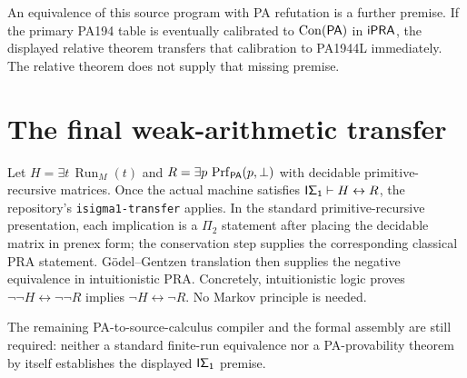 An equivalence of this source program with PA refutation is a further
premise. If the primary PA194 table is eventually calibrated to
$\operatorname{Con}(\mathsf{PA})$ in $\mathsf{iPRA}$, the displayed relative theorem
transfers that calibration to PA1944L immediately. The relative theorem
does not supply that missing premise.

\section{The final weak-arithmetic transfer}

Let $H=\exists t\,\operatorname{Run}_M(t)$ and
$R=\exists p\,\operatorname{Prf}_{\mathsf{PA}}(p,\bot)$ with decidable
primitive-recursive matrices. Once the actual machine satisfies
$\mathsf{I\Sigma_1}\vdash H\leftrightarrow R$, the repository's
\texttt{isigma1-transfer} applies. In the standard primitive-recursive
presentation, each implication is a $\Pi_2$ statement after placing the
decidable matrix in prenex form; the conservation step supplies the
corresponding classical PRA statement. G\"odel--Gentzen translation then
supplies the negative equivalence in intuitionistic PRA. Concretely,
intuitionistic logic proves $\neg\neg H\leftrightarrow\neg\neg R$
implies $\neg H\leftrightarrow\neg R$. No Markov principle is needed.

The remaining PA-to-source-calculus compiler and the formal assembly are
still required: neither a standard finite-run equivalence nor a
PA-provability theorem by itself establishes the displayed $\mathsf{I\Sigma_1}$ premise.


